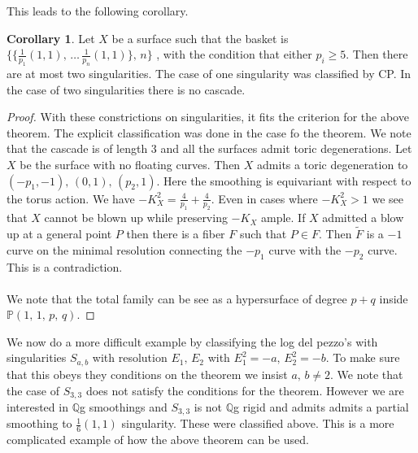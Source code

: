 \documentclass[11pt]{report}
\theoremstyle{definition}
\theoremstyle{definition}
\newtheorem{cor}[thm]{Corollary}
\theoremstyle{definition}
\theoremstyle{definition}
\theoremstyle{definition}
\theoremstyle{definition}
\theoremstyle{definition}
\theoremstyle{definition}
\newcommand{\ldp}{log del pezzo}
\newcommand{\mb}[1]{\mathbb{#1}}
\begin{document}
 This leads to the following corollary.
\begin{cor}
Let $X$ be a surface such that the basket is  $\{ \{ \frac{1}{p_1}(1,1), \, \dots \, \frac{1}{p_n}(1,1) \}, \, n \}$ , with the condition that either $p_i \geq 5$. Then there are at most two singularities. The case of one singularity was classified by CP. In the case of two singularities there is no cascade. 
\end{cor}
\begin{proof}
With these constrictions on singularities, it fits the criterion for the above theorem. The explicit classification was done in the case fo the theorem. We note that the cascade is of length 3 and all the surfaces admit toric degenerations. Let $X$ be the surface with no floating curves. Then $X$ admits a toric degeneration to $(-p_1, -1), \, (0, 1), \, (p_2, 1)$. Here the smoothing is equivariant with respect to the torus action. We have $-K_X^2 = \frac{4}{p_1} + \frac{4}{p_2}$. Even in cases where $-K_X^2 > 1$ we see that $X$ cannot be blown up while preserving $-K_X$ ample. If $X$ admitted a blow up at a general point $P$ then there is a fiber $F$ such that $P \in F$. Then $\widetilde F$ is a $-1$ curve on the minimal resolution connecting the $-p_1$ curve with the $-p_2$ curve. This is a contradiction.
\\
\\
We note that the total family can be see as a hypersurface of degree $p+q$ inside $\mb{P}(1,\,1,\,p,\,q)$.
\end{proof}
We now do a more difficult example by classifying the \ldp's with singularities $S_{a,b}$ with resolution $E_1, \, E_2$ with $E_1^2 = -a,\, E_2^2 = -b$. To make sure that this obeys they conditions on the theorem we insist $a, \, b \neq 2$. We note that the case of $S_{3,3}$ does not satisfy the conditions for the theorem. However we are interested in $\mb{Q}$g smoothings and $S_{3,3}$ is not $\mb{Q}$g rigid and admits admits a partial smoothing to $\frac{1}{6}(1,1)$ singularity. These were classified above. This is a more complicated example of how the above theorem can be used.
\\
\\
\end{document}
